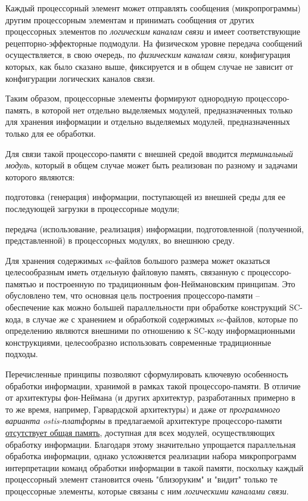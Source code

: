 \begin{textitemize}
	\item Каждый процессорный элемент может отправлять сообщения (микропрограммы) другим процессорным элементам и принимать сообщения от других процессорных элементов по \textit{логическим каналам связи} и имеет соответствующие рецепторно-эффекторные подмодули. На физическом уровне передача сообщений осуществляется, в свою очередь, по \textit{физическим каналам связи}, конфигурация которых, как было сказано выше, фиксируется и в общем случае не зависит от конфигурации логических каналов связи.
	\item Таким образом, процессорные элементы формируют однородную процессоро-память, в которой нет отдельно выделяемых модулей, предназначенных только для хранения информации и отдельно выделяемых модулей, предназначенных только для ее обработки. 
	\item Для связи такой процессоро-памяти с внешней средой вводится \textit{терминальный модуль}, который в общем случае может быть реализован по разному и задачами которого являются:
	\begin{textitemize}
		\item подготовка (генерация) информации, поступающей из внешней среды для ее последующей загрузки в процессорные модули;
		\item передача (использование, реализация) информации, подготовленной (полученной, представленной) в процессорных модулях, во внешнюю среду.
	\end{textitemize}
	\item Для хранения содержимых sc-файлов большого размера может оказаться целесообразным иметь отдельную файловую память, связанную с процессоро-памятью и построенную по традиционным фон-Неймановским принципам. Это обусловлено тем, что основная цель построения процессоро-памяти -- обеспечение как можно большей параллельности при обработке конструкций SC-кода, в случае же с хранением и обработкой содержимых sc-файлов, которые по определению являются внешними по отношению к SC-коду информационными конструкциями, целесообразно использовать современные традиционные подходы.
\end{textitemize}

Перечисленные принципы позволяют сформулировать ключевую особенность обработки информации, хранимой в рамках такой процессоро-памяти. В отличие от архитектуры фон-Неймана (и других архитектур, разработанных примерно в то же время, например, Гарвардской архитектуры) и даже от \textit{программного варианта ostis-платформы} в предлагаемой архитектуре процессоро-памяти \underline{отсутствует общая память}, доступная для всех модулей, осуществляющих обработку информации. Благодаря этому значительно упрощается параллельная обработка информации, однако усложняется реализации набора микропрограмм интерпретации команд обработки информации в такой памяти, поскольку каждый процессорный элемент становится очень "близоруким"{} и "видит"{} только те процессорные элементы, которые связаны с ним \textit{логическими каналами связи}. 

